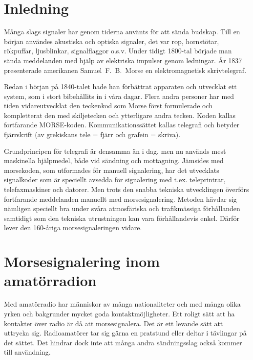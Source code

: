 \section{Inledning}

Många slags signaler har genom tiderna använts för att sända budskap. Till en
början användes akustiska och optiska signaler, det var rop, hornstötar,
rökpuffar, ljusblinkar, signalflaggor o.s.v. Under tidigt 1800-tal började man
sända meddelanden med hjälp av elektriska impulser genom ledningar. År 1837
presenterade amerikanen Samuel~F.~B.~Morse en elektromagnetisk skrivtelegraf.

Redan i början på 1840-talet hade han förbättrat apparaten och utvecklat ett
system, som i stort bibehållits in i våra dagar. Flera andra personer har med
tiden vidareutvecklat den teckenkod som Morse först formulerade och kompletterat
den med skiljetecken och ytterligare andra tecken. Koden kallas fortfarande
MORSE-koden. Kommunikationssättet kallas telegrafi och betyder fjärrskrift (av
grekiskans tele = fjärr och grafein = skriva).

Grundprincipen för telegrafi är densamma än i dag, men nu används mest
maskinella hjälpmedel, både vid sändning och mottagning. Jämsides med
morsekoden, som utformades för manuell signalering, har det utvecklats
signalkoder som är speciellt avsedda för signalering med t.ex. teleprintrar,
telefaxmaskiner och datorer. Men trots den snabba tekniska utvecklingen överförs
fortfarande meddelanden manuellt med morsesignalering. Metoden hävdar sig
nämligen speciellt bra under svåra atmosfäriska och trafikmässiga förhållanden
samtidigt som den tekniska utrustningen kan vara förhållandevis enkel. Därför
lever den 160-åriga morsesignaleringen vidare.

\section{Morsesignalering inom amatörradion}

Med amatörradio har människor av många nationaliteter och med många olika yrken
och bakgrunder mycket goda kontaktmöjligheter. Ett roligt sätt att ha kontakter
över radio är då att morsesignalera. Det är ett levande sätt att uttrycka sig.
Radioamatörer tar sig gärna en pratstund eller deltar i tävlingar på det sättet.
Det hindrar dock inte att många andra sändningsslag också kommer till
användning.


